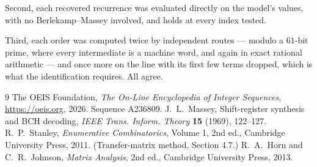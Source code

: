 \documentclass[11pt,a4paper]{article}
\theoremstyle{plain}
\theoremstyle{definition}
\begin{document}
Second, each recovered recurrence was evaluated directly on the model's values, with no
Berlekamp--Massey involved, and holds at every index tested.

Third, each order was computed twice by independent routes --- modulo a $61$-bit prime, where
every intermediate is a machine word, and again in exact rational arithmetic --- and once more
on the line with its first few terms dropped, which is what the identification requires. All
agree.

\begin{thebibliography}{9}
 The OEIS Foundation, \emph{The On-Line Encyclopedia of Integer
Sequences}, \url{https://oeis.org}, 2026. Sequence A236809.
 J.~L.~Massey, Shift-register synthesis and BCH decoding, \emph{IEEE
Trans. Inform. Theory} \textbf{15} (1969), 122--127.
 R.~P.~Stanley, \emph{Enumerative Combinatorics}, Volume 1, 2nd ed.,
Cambridge University Press, 2011. (Transfer-matrix method, Section 4.7.)
 R.~A.~Horn and C.~R.~Johnson, \emph{Matrix Analysis}, 2nd ed., Cambridge
University Press, 2013.
\end{thebibliography}
\end{document}
